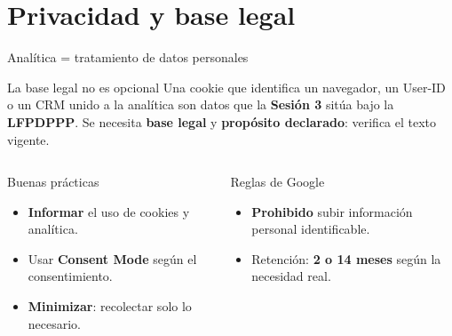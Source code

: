\documentclass[aspectratio=169,xcolor=dvipsnames]{beamer}
\begin{document}
\section[Ética]{Privacidad y base legal}

\begin{frame}{Analítica = tratamiento de datos personales}
\begin{alertblock}{La base legal no es opcional}
  Una cookie que identifica un navegador, un User-ID o un CRM unido a la analítica son datos que la \textbf{Sesión 3} sitúa bajo la \textbf{LFPDPPP}. Se necesita \textbf{base legal} y \textbf{propósito declarado}: verifica el texto vigente.
\end{alertblock}
\begin{columns}[T]
  \begin{block}{Buenas prácticas}
    \scriptsize
    \begin{itemize}
      \item \textbf{Informar} el uso de cookies y analítica.
      \item Usar \textbf{Consent Mode} según el consentimiento.
      \item \textbf{Minimizar}: recolectar solo lo necesario.
    \end{itemize}
  \end{block}
  \begin{exampleblock}{Reglas de Google}
    \scriptsize
    \begin{itemize}
      \item \textbf{Prohibido} subir información personal identificable.
      \item Retención: \textbf{2 o 14 meses} según la necesidad real.
    \end{itemize}
  \end{exampleblock}
\end{columns}
\end{frame}
\end{document}
